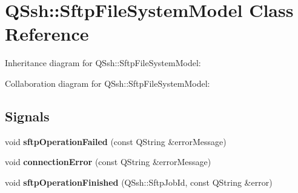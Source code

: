 \hypertarget{class_q_ssh_1_1_sftp_file_system_model}{}\section{Q\+Ssh\+:\+:Sftp\+File\+System\+Model Class Reference}
\label{class_q_ssh_1_1_sftp_file_system_model}


Inheritance diagram for Q\+Ssh\+:\+:Sftp\+File\+System\+Model\+:


Collaboration diagram for Q\+Ssh\+:\+:Sftp\+File\+System\+Model\+:
\subsection*{Signals}
\begin{DoxyCompactItemize}
\item 
\mbox{\label{class_q_ssh_1_1_sftp_file_system_model_a6729357930767c290539a246ccd9a4eb}} 
void {\bfseries sftp\+Operation\+Failed} (const Q\+String \&error\+Message)
\item 
\mbox{\label{class_q_ssh_1_1_sftp_file_system_model_a923f7afc1292f2fb1bf9d35a289b9212}} 
void {\bfseries connection\+Error} (const Q\+String \&error\+Message)
\item 
\mbox{\label{class_q_ssh_1_1_sftp_file_system_model_a6de2941a1df7e6ec80b555a944d65911}} 
void {\bfseries sftp\+Operation\+Finished} (Q\+Ssh\+::\+Sftp\+Job\+Id, const Q\+String \&error)
\end{DoxyCompactItemize}
